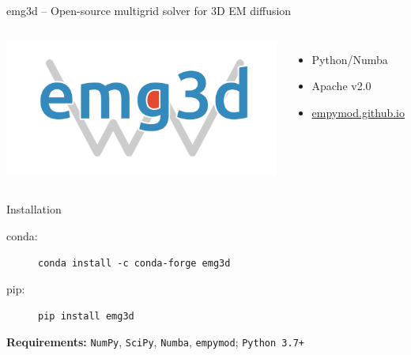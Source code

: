 \documentclass[xcolor=svgnames, aspectratio=169]{beamer}
\begin{document}
  \begin{frame}%
    {emg3d  -- Open-source multigrid solver for 3D EM diffusion}
    \vfill
    \begin{columns}
      \centering
        \includegraphics[width=.8\linewidth]{logo-emg3d}\\
        \begin{itemize}
          \item Python/Numba
          \item Apache v2.0
          \item \href{https://empymod.github.io}{empymod.github.io}
        \end{itemize}
    \end{columns}
    \vfill
    \begin{columns}
    \begin{block}{Installation}
      \vspace{0.5em}
      \begin{description}
        \item[conda:] \texttt{conda install -c conda-forge emg3d}
        \item[pip:] \texttt{pip install emg3d}
      \end{description}
      \centering
      \textbf{Requirements:} \texttt{NumPy}, \texttt{SciPy}, \texttt{Numba},
      \texttt{empymod}; \texttt{Python 3.7+}
      \vspace{0.5em}
    \end{block}
  \end{columns}
  \end{frame}
\end{document}
